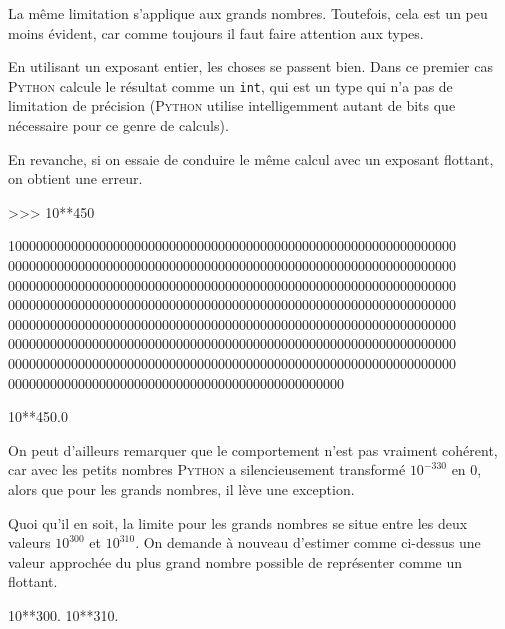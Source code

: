 \vfill\pagebreak

\begin{exercise}[title=Plus grand flottant, level=basic]
La même limitation s'applique aux grands nombres. Toutefois, cela est un peu moins évident, car comme toujours il faut faire attention aux types.

En utilisant un exposant entier, les choses se passent bien. Dans ce premier cas \textsc{Python} calcule le résultat comme un \texttt{int}, qui est un type qui n'a pas de limitation de précision (\textsc{Python} utilise intelligemment autant de bits que nécessaire pour ce genre de calculs).

En revanche, si on essaie de conduire le même calcul avec un exposant flottant, on obtient une erreur.

\begin{idleconsole}%
	\begin{pyverbatim}
		>>> 10**450
	\end{pyverbatim}
	\vspace{-0.4\baselineskip}
	\textcolor{idleoutputcolor}{1000000000000000000000000000000000000000000000000000000000000000}
	\textcolor{idleoutputcolor}{0000000000000000000000000000000000000000000000000000000000000000}
	\textcolor{idleoutputcolor}{0000000000000000000000000000000000000000000000000000000000000000}
	\textcolor{idleoutputcolor}{0000000000000000000000000000000000000000000000000000000000000000}
	\textcolor{idleoutputcolor}{0000000000000000000000000000000000000000000000000000000000000000}
	\textcolor{idleoutputcolor}{0000000000000000000000000000000000000000000000000000000000000000}
	\textcolor{idleoutputcolor}{0000000000000000000000000000000000000000000000000000000000000000}
	\textcolor{idleoutputcolor}{000000000000000000000000000000000000000000000000}
	\begin{pyconsole}[][breaklines, breakafter=0123456789]
		10**450.0
	\end{pyconsole}
\end{idleconsole}

On peut d'ailleurs remarquer que le comportement n'est pas vraiment cohérent, car avec les petits nombres \textsc{Python} a silencieusement transformé $10^{−330}$ en $0$, alors que pour les grands nombres, il lève une exception.

Quoi qu'il en soit, la limite pour les grands nombres se situe entre les deux valeurs $10^300$ et $10^310$. On demande à nouveau d'estimer comme ci-dessus une valeur approchée du plus grand nombre possible de représenter comme un flottant.

\begin{idleconsole}
	\begin{pyconsole}
		10**300.
		10**310.
	\end{pyconsole}
\end{idleconsole}
\end{exercise}

